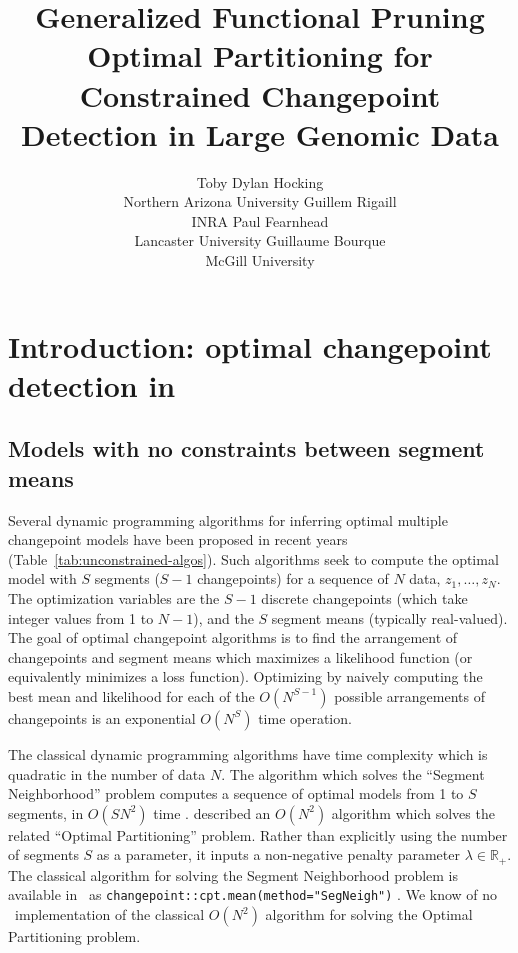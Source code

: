 \documentclass[article]{jss}
\author{Toby Dylan Hocking\\Northern Arizona University
   \And Guillem Rigaill\\INRA
   \And Paul Fearnhead\\Lancaster University
   \And Guillaume Bourque\\McGill University}
\title{Generalized Functional Pruning Optimal Partitioning
  for Constrained Changepoint Detection in Large Genomic Data}
\newcommand{\R}{\proglang{R}}
\newcommand{\RR}{\mathbb R}
\begin{document}


\section[Introduction: optimal changepoint detection in R]{Introduction: optimal changepoint detection in } \label{sec:intro}

\subsection{Models with no constraints between segment means}

Several dynamic programming algorithms for inferring optimal multiple
changepoint models have been proposed in recent years
(Table~\ref{tab:unconstrained-algos}). Such algorithms seek to compute
the optimal model with $S$ segments ($S-1$ changepoints) for a
sequence of $N$ data, $z_1,\dots,z_N$. The optimization variables are
the $S-1$ discrete changepoints (which take integer values from 1 to
$N-1$), and the $S$ segment means (typically real-valued). The goal of
optimal changepoint algorithms is to find the arrangement of
changepoints and segment means which maximizes a likelihood function
(or equivalently minimizes a loss function). Optimizing by naively
computing the best mean and likelihood for each of the $O(N^{S-1})$
possible arrangements of changepoints is an exponential $O(N^S)$ time
operation.

The classical dynamic programming algorithms have time complexity
which is quadratic in the number of data $N$. The algorithm which
solves the ``Segment Neighborhood'' problem computes a sequence of
optimal models from 1 to $S$ segments, in $O(SN^2)$ time
\citet{segment-neighborhood}.  \citet{optimal-partitioning} described
an $O(N^2)$ algorithm which solves the related ``Optimal
Partitioning'' problem. Rather than explicitly using the number of
segments $S$ as a parameter, it inputs a non-negative penalty
parameter $\lambda\in \RR_+$. The classical algorithm for solving the
Segment Neighborhood problem is available in \R\ as
\verb|changepoint::cpt.mean(method="SegNeigh")|
\citep{changepoint}. We know of no \R\ implementation of the classical
$O(N^2)$ algorithm for solving the Optimal Partitioning problem.
\end{document}
